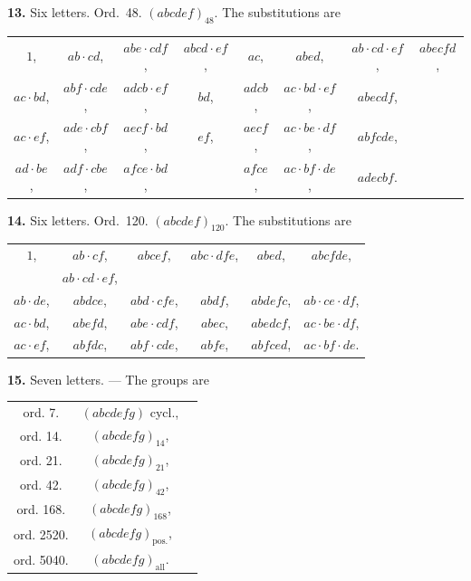 \documentclass[11pt,a4paper]{book}
\begin{document}
\vspace{0.5em}
\textbf{13.} Six letters. Ord.~48. $(abcdef)_{48}$. The substitutions are
\begin{center}
\begin{tabular}{cccccccc}
$1$, & $ab \cdot cd$, & $abe \cdot cdf$, & $abcd \cdot ef$, & $ac$, & $abed$, & $ab \cdot cd \cdot ef$, & $abecfd$, \\
$ac \cdot bd$, & $abf \cdot cde$, & $adcb \cdot ef$, & $bd$, & $adcb$, & $ac \cdot bd \cdot ef$, & $abecdf$, \\
$ac \cdot ef$, & $ade \cdot cbf$, & $aecf \cdot bd$, & $ef$, & $aecf$, & $ac \cdot be \cdot df$, & $abfcde$, \\
$ad \cdot be$, & $adf \cdot cbe$, & $afce \cdot bd$, & & $afce$, & $ac \cdot bf \cdot de$, & $adecbf$.
\end{tabular}
\end{center}

\vspace{0.5em}
\textbf{14.} Six letters. Ord.~120. $(abcdef)_{120}$. The substitutions are
\begin{center}
\begin{tabular}{cccccc}
$1$, & $ab \cdot cf$, & $abcef$, & $abc \cdot dfe$, & $abed$, & $abcfde$, \\
& $ab \cdot cd \cdot ef$, \\
$ab \cdot de$, & $abdce$, & $abd \cdot cfe$, & $abdf$, & $abdefc$, & $ab \cdot ce \cdot df$, \\
$ac \cdot bd$, & $abefd$, & $abe \cdot cdf$, & $abec$, & $abedcf$, & $ac \cdot be \cdot df$, \\
$ac \cdot ef$, & $abfdc$, & $abf \cdot cde$, & $abfe$, & $abfced$, & $ac \cdot bf \cdot de$.
\end{tabular}
\end{center}

\vspace{0.5em}
\textbf{15.} Seven letters. --- The groups are
\begin{center}
\begin{tabular}{ccl}
ord.  7. & $(abcdefg)$ cycl., \\
ord. 14. & $(abcdefg)_{14}$, \\
ord. 21. & $(abcdefg)_{21}$, \\
ord. 42. & $(abcdefg)_{42}$, \\
ord. 168. & $(abcdefg)_{168}$, \\
ord. 2520. & $(abcdefg)_{\text{pos.}}$, \\
ord. 5040. & $(abcdefg)_{\text{all}}$.
\end{tabular}
\end{center}
\end{document}
